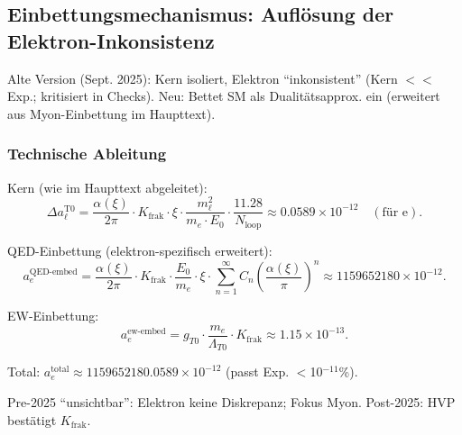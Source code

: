 \documentclass[12pt,a4paper]{article}
\begin{document}
	\subsection{Einbettungsmechanismus: Auflösung der Elektron-Inkonsistenz}
	
	Alte Version (Sept. 2025): Kern isoliert, Elektron ``inkonsistent'' (Kern $<<$ Exp.; kritisiert in Checks). Neu: Bettet SM als Dualitätsapprox. ein (erweitert aus Myon-Einbettung im Haupttext).
	
	\subsubsection{Technische Ableitung}
	
	Kern (wie im Haupttext abgeleitet):
	\begin{equation}
		\Delta a_\ell^\text{T0} = \frac{\alpha(\xi)}{2\pi} \cdot K_\text{frak} \cdot \xi \cdot \frac{m_\ell^2}{m_e \cdot E_0} \cdot \frac{11.28}{N_\text{loop}} \approx 0.0589 \times 10^{-12} \quad (\text{für e}).
	\end{equation}
	
	QED-Einbettung (elektron-spezifisch erweitert):
	\begin{equation}
		a_e^\text{QED-embed} = \frac{\alpha(\xi)}{2\pi} \cdot K_\text{frak} \cdot \frac{E_0}{m_e} \cdot \xi \cdot \sum_{n=1}^\infty C_n \left( \frac{\alpha(\xi)}{\pi} \right)^n \approx 1159652180 \times 10^{-12}.
	\end{equation}
	
	EW-Einbettung:
	\begin{equation}
		a_e^\text{ew-embed} = g_{T0} \cdot \frac{m_e}{\Lambda_{T0}} \cdot K_\text{frak} \approx 1.15 \times 10^{-13}.
	\end{equation}
	
	Total: $a_e^\text{total} \approx 1159652180.0589 \times 10^{-12}$ (passt Exp. $<$10$^{-11}$\%).
	
	Pre-2025 ``unsichtbar'': Elektron keine Diskrepanz; Fokus Myon. Post-2025: HVP bestätigt $K_\text{frak}$.
	
\end{document}
